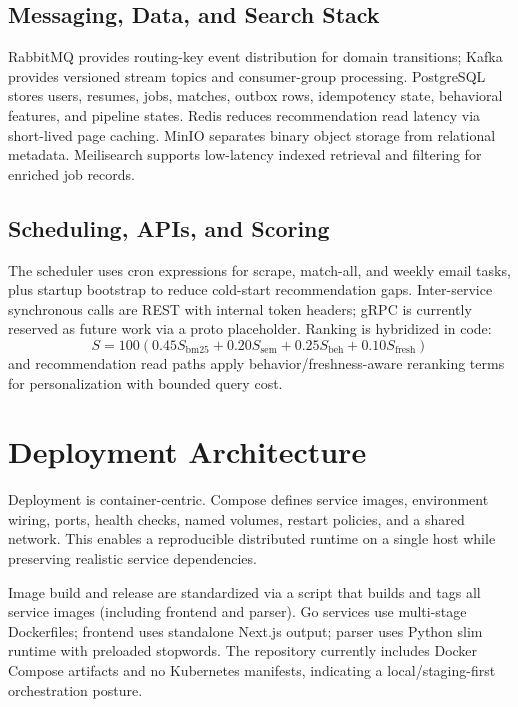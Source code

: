 \documentclass[conference]{IEEEtran}
\begin{document}
\subsection{Messaging, Data, and Search Stack}
RabbitMQ provides routing-key event distribution for domain transitions; Kafka provides versioned stream topics and consumer-group processing. PostgreSQL stores users, resumes, jobs, matches, outbox rows, idempotency state, behavioral features, and pipeline states. Redis reduces recommendation read latency via short-lived page caching. MinIO separates binary object storage from relational metadata. Meilisearch supports low-latency indexed retrieval and filtering for enriched job records.

\subsection{Scheduling, APIs, and Scoring}
The scheduler uses cron expressions for scrape, match-all, and weekly email tasks, plus startup bootstrap to reduce cold-start recommendation gaps. Inter-service synchronous calls are REST with internal token headers; gRPC is currently reserved as future work via a proto placeholder. Ranking is hybridized in code:
\begin{equation}
S = 100\left(0.45S_{\mathrm{bm25}} + 0.20S_{\mathrm{sem}} + 0.25S_{\mathrm{beh}} + 0.10S_{\mathrm{fresh}}\right)
\end{equation}
and recommendation read paths apply behavior/freshness-aware reranking terms for personalization with bounded query cost.

\section{Deployment Architecture}
Deployment is container-centric. Compose defines service images, environment wiring, ports, health checks, named volumes, restart policies, and a shared network. This enables a reproducible distributed runtime on a single host while preserving realistic service dependencies.

Image build and release are standardized via a script that builds and tags all service images (including frontend and parser). Go services use multi-stage Dockerfiles; frontend uses standalone Next.js output; parser uses Python slim runtime with preloaded stopwords. The repository currently includes Docker Compose artifacts and no Kubernetes manifests, indicating a local/staging-first orchestration posture.
\end{document}
